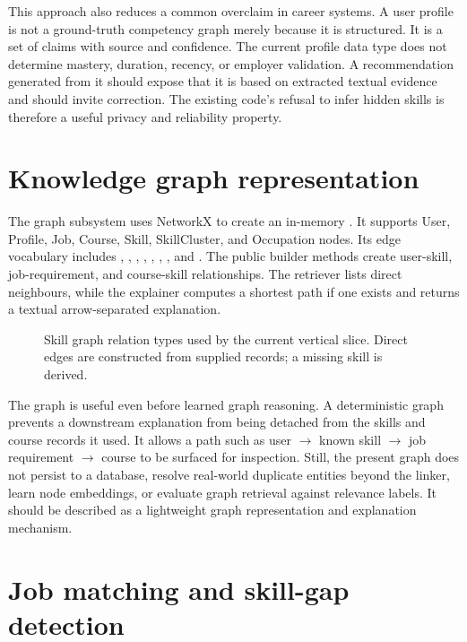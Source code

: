 This approach also reduces a common overclaim in career systems. A user profile is not a ground-truth competency graph merely because it is structured. It is a set of claims with source and confidence. The current profile data type does not determine mastery, duration, recency, or employer validation. A recommendation generated from it should expose that it is based on extracted textual evidence and should invite correction. The existing code's refusal to infer hidden skills is therefore a useful privacy and reliability property.

\section{Knowledge graph representation}

The graph subsystem uses NetworkX to create an in-memory . It supports User, Profile, Job, Course, Skill, SkillCluster, and Occupation nodes. Its edge vocabulary includes , , , , , , , and . The public builder methods create user-skill, job-requirement, and course-skill relationships. The retriever lists direct neighbours, while the explainer computes a shortest path if one exists and returns a textual arrow-separated explanation.

\begin{figure}[H]
\centering

\caption{Skill graph relation types used by the current vertical slice. Direct edges are constructed from supplied records; a missing skill is derived.}
\label{fig:graph-schema}
\end{figure}

The graph is useful even before learned graph reasoning. A deterministic graph prevents a downstream explanation from being detached from the skills and course records it used. It allows a path such as user $\rightarrow$ known skill $\rightarrow$ job requirement $\rightarrow$ course to be surfaced for inspection. Still, the present graph does not persist to a database, resolve real-world duplicate entities beyond the linker, learn node embeddings, or evaluate graph retrieval against relevance labels. It should be described as a lightweight graph representation and explanation mechanism.

\section{Job matching and skill-gap detection}

